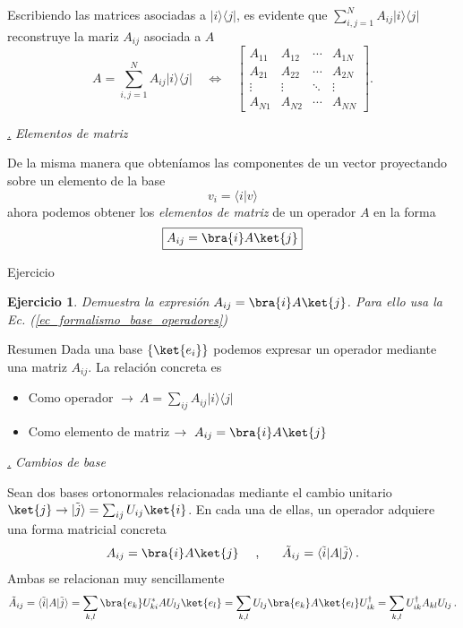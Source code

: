 \documentclass[a4paper,11pt]{book} %
\newtheorem{ejercicio_contador}{Ejercicio}
\newcommand{\Ejercicio}[1]{
		\begin{mybox_gray}{Ejercicio} 
			\begin{ejercicio_contador}
				 #1 
			\end{ejercicio_contador} 
		\end{mybox_gray}
	}
\numberwithin{equation}{chapter}
\newcommand{\branew}[1]{\langle #1|}
\newcommand{\ketnew}[1]{|#1\rangle}
\newcommand{\braket}[2]{\langle #1|#2\rangle}
\newcommand{\ketbra}[2]{| #1\rangle \! \langle #2|}
\def\subsubiContadorIt{\par\addtocounter{subsubsection}{1}\underline{\it\thesubsubsection.}\hskip0.5cm \setcounter{subsubsubsectionIt}{0}}
\newcommand{\SubsubiIt}[1]{
		\subsubiContadorIt \textit{#1}
	}
\newcounter{subsubsubsectionIt}[subsubsection]
\begin{document}
Escribiendo las matrices asociadas a $\ketbra{i}{j}$, es evidente que $\sum_{i,j=1}^N A_{ij} \ketbra{i}{j} $ reconstruye la mariz $A_{ij}$ asociada a $A$
	\begin{equation}
	A= \sum_{i,j=1}^N A_{ij} \ketbra{i}{j} \,~~~~ \Longleftrightarrow ~~~~
 \begin{bmatrix} 
A_{11} & A_{12} & \cdots & A_{1N} \\
A_{21} & A_{22} & \cdots & A_{2N} \\
\vdots & \vdots &  \ddots      & \vdots \\
A_{N1} & A_{N2} &    \cdots    & A_{NN}
\end{bmatrix} .
	\end{equation}


			\SubsubiIt{Elementos de matriz}

De la misma manera que obteníamos las componentes de un vector proyectando sobre un elemento de la base
	\begin{equation}
	v_i = \braket{i}{v}
	\end{equation}
ahora podemos obtener los \textit{elementos de matriz} de un operador $A$ en la forma
	\begin{equation}
	\boxed{A_{ij} = \bra{i} A \ket{j}}
	\end{equation}

	\Ejercicio{
	Demuestra la expresión $A_{ij} = \bra{i} A \ket{j}$. Para ello usa la Ec. (\ref{ec_formalismo_base_operadores})
	}

	\begin{mybox_blue}{Resumen}
	Dada una base $\{\ket{e_i}\}$ podemos expresar un operador mediante una matriz $A_{ij}$. La relación concreta es 
	\begin{itemize}
		\item Como operador $\to ~ A = \sum_{ij} A_{ij}\ketbra{i}{j}$
		\item Como elemento de matriz $\to ~ A_{ij} = \bra{i}A\ket{j}$
	\end{itemize}
	\end{mybox_blue}

			\SubsubiIt{Cambios de base}

Sean  dos bases ortonormales relacionadas mediante el cambio unitario $ \ket{j} \to  \ketnew{\tilde{j}} = \sum_{ij}U_{ij} \ket{i}$. En cada una de ellas, un operador adquiere una forma matricial concreta 
	\begin{equation}
 A_{ij} = \bra{i} A \ket{j} ~~~~,~~~~~ \tilde A_{ij} = \branew{\tilde i} A \ketnew{\tilde j} \, .
	\end{equation}
Ambas se relacionan muy sencillamente
	\begin{equation}
	\tilde A_{ij} = \branew{\tilde i} A \ketnew{\tilde j} = \sum_{k,l}\bra{e_k}U^*_{ki} A U_{lj}\ket{e_l} =  \sum_{k,l} U_{lj}\bra{e_k} A  \ket{e_l} U^\dagger_{ik}  = \sum_{k,l} U^\dagger_{ik}A_{kl} U_{lj} \, .
	\end{equation}
\end{document}
